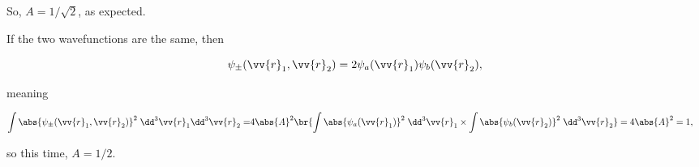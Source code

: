 \begin{parts}
  So, $A = 1/\sqrt{2}$, as expected.



\item If the two wavefunctions are the same, then

  \begin{equation}
    \psi_\pm(\vv{r}_1,\vv{r}_2) = 2\psi_a(\vv{r}_1)\psi_b(\vv{r}_2),
  \end{equation}

  meaning

  \begin{align}
    \int \abs{\psi_\pm(\vv{r}_1,\vv{r}_2)}^2 \;\dd^3\vv{r}_1\dd^3\vv{r}_2 =& 4\abs{A}^2\br{\int \abs{\psi_a(\vv{r}_1)}^2 \;\dd^3\vv{r}_1 \times \int \abs{\psi_b(\vv{r}_2)}^2\;\dd^3\vv{r}_2} = 4\abs{A}^2 = 1,
  \end{align}

  so this time, $A = 1/2$.

  
\end{parts}

